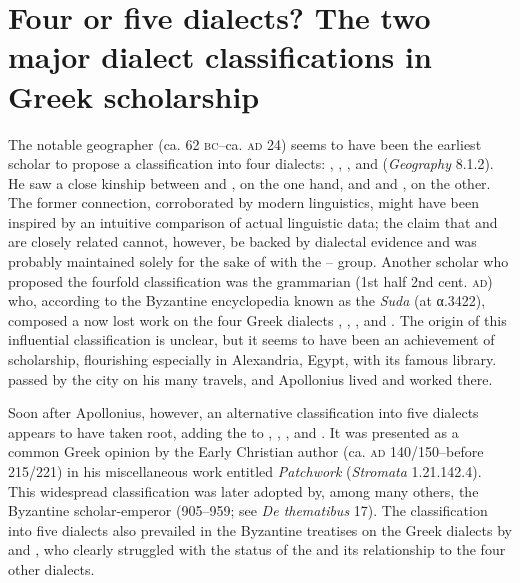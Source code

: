 \section[Four or five dialects?]{Four or five dialects? The two major dialect classifications in Greek scholarship}\label{sec:2.2}

The notable geographer  (ca. 62 \textsc{bc–}ca. \textsc{ad} 24) seems to have been the earliest scholar to propose a classification into four dialects: , , , and  (\textit{Geography} 8.1.2). He saw a close kinship between  and , on the one hand, and  and , on the other. The former connection, corroborated by modern linguistics, might have been inspired by an intuitive comparison of actual linguistic data; the claim that  and  are closely related cannot, however, be backed by dialectal evidence and was probably maintained solely for the sake of  with the – group. Another scholar who proposed the fourfold classification was the grammarian  (1st half 2nd cent. \textsc{ad}) who, according to the Byzantine encyclopedia known as the \textit{Suda} (at α.3422), composed a now lost work on the four Greek dialects , , , and . The origin of this influential classification is unclear, but it seems to have been an achievement of  scholarship, flourishing especially in Alexandria, Egypt, with its famous library.  passed by the city on his many travels, and Apollonius lived and worked there.

Soon after Apollonius, however, an alternative classification into five dialects appears to have taken root, adding the  to , , , and . It was presented as a common Greek opinion by the Early Christian author  (ca. \textsc{ad} 140/150–before 215/221) in his miscellaneous work entitled \textit{Patchwork} (\textit{Stromata} 1.21.142.4). This widespread classification was later adopted by, among many others, the Byzantine scholar-emperor  (905–959; see \textit{De thematibus} 17). The classification into five dialects also prevailed in the Byzantine treatises on the Greek dialects by  and , who clearly struggled with the status of the  and its relationship to the four other dialects.

